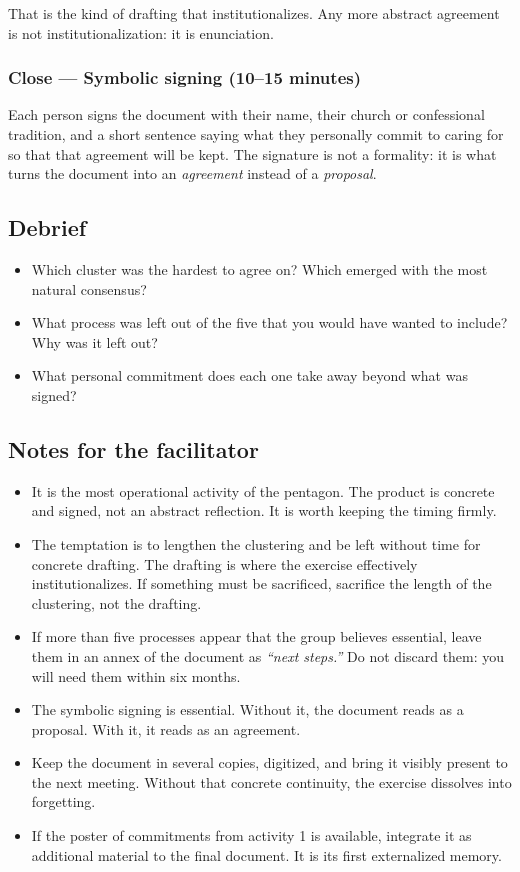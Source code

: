 \documentclass[11pt, a4paper]{article}
\begin{document}
\begin{actividad}
That is the kind of drafting that institutionalizes. Any more abstract agreement is not institutionalization: it is enunciation.

\subsubsection*{Close --- Symbolic signing (10--15 minutes)}
Each person signs the document with their name, their church or confessional tradition, and a short sentence saying what they personally commit to caring for so that that agreement will be kept. The signature is not a formality: it is what turns the document into an \emph{agreement} instead of a \emph{proposal}.

\subsection*{Debrief}
\begin{itemize}
  \item Which cluster was the hardest to agree on? Which emerged with the most natural consensus?
  \item What process was left out of the five that you would have wanted to include? Why was it left out?
  \item What personal commitment does each one take away beyond what was signed?
\end{itemize}

\subsection*{Notes for the facilitator}
\begin{itemize}
  \item It is the most operational activity of the pentagon. The product is concrete and signed, not an abstract reflection. It is worth keeping the timing firmly.
  \item The temptation is to lengthen the clustering and be left without time for concrete drafting. The drafting is where the exercise effectively institutionalizes. If something must be sacrificed, sacrifice the length of the clustering, not the drafting.
  \item If more than five processes appear that the group believes essential, leave them in an annex of the document as \emph{``next steps.''} Do not discard them: you will need them within six months.
  \item The symbolic signing is essential. Without it, the document reads as a proposal. With it, it reads as an agreement.
  \item Keep the document in several copies, digitized, and bring it visibly present to the next meeting. Without that concrete continuity, the exercise dissolves into forgetting.
  \item If the poster of commitments from activity 1 is available, integrate it as additional material to the final document. It is its first externalized memory.
\end{itemize}

\end{actividad}
\end{document}
